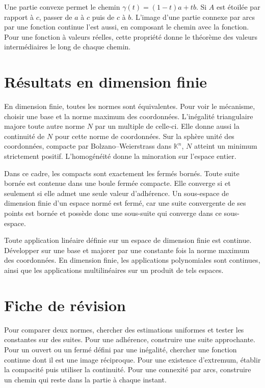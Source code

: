 \documentclass[11pt,a4paper]{article}
\begin{document}
Une partie convexe permet le chemin $\gamma(t)=(1-t)a+tb$. Si $A$ est étoilée par rapport à $c$, passer de $a$ à $c$ puis de $c$ à $b$. L’image d’une partie connexe par arcs par une fonction continue l’est aussi, en composant le chemin avec la fonction. Pour une fonction à valeurs réelles, cette propriété donne le théorème des valeurs intermédiaires le long de chaque chemin.

\section*{Résultats en dimension finie}
En dimension finie, toutes les normes sont équivalentes. Pour voir le mécanisme, choisir une base et la norme maximum des coordonnées. L’inégalité triangulaire majore toute autre norme $N$ par un multiple de celle-ci. Elle donne aussi la continuité de $N$ pour cette norme de coordonnées. Sur la sphère unité des coordonnées, compacte par Bolzano–Weierstrass dans $\mathbb K^n$, $N$ atteint un minimum strictement positif. L’homogénéité donne la minoration sur l’espace entier.

Dans ce cadre, les compacts sont exactement les fermés bornés. Toute suite bornée est contenue dans une boule fermée compacte. Elle converge si et seulement si elle admet une seule valeur d’adhérence. Un sous-espace de dimension finie d’un espace normé est fermé, car une suite convergente de ses points est bornée et possède donc une sous-suite qui converge dans ce sous-espace.

Toute application linéaire définie sur un espace de dimension finie est continue. Développer sur une base et majorer par une constante fois la norme maximum des coordonnées. En dimension finie, les applications polynomiales sont continues, ainsi que les applications multilinéaires sur un produit de tels espaces.

\section*{Fiche de révision}
Pour comparer deux normes, chercher des estimations uniformes et tester les constantes sur des suites. Pour une adhérence, construire une suite approchante. Pour un ouvert ou un fermé défini par une inégalité, chercher une fonction continue dont il est une image réciproque. Pour une existence d’extremum, établir la compacité puis utiliser la continuité. Pour une connexité par arcs, construire un chemin qui reste dans la partie à chaque instant.
\end{document}
